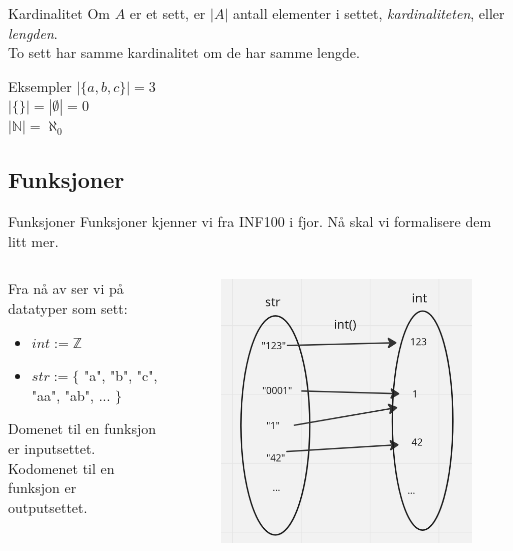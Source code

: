 \begin{frame}{Kardinalitet}
    Om $A$ er et sett, er $|A|$ antall elementer i settet, \textit{kardinaliteten}, eller \textit{lengden}.\\
    To sett har samme kardinalitet om de har samme lengde.
    \begin{block}{Eksempler}
        $|\{a, b, c\}| = 3$ \\
        $|\{\}| = |\emptyset| = 0$\\
        $|\mathbb{N}| = \aleph_0$
    \end{block}
\end{frame}

\subsection{Funksjoner}
\begin{frame}{Funksjoner}
    Funksjoner kjenner vi fra INF100 i fjor. Nå skal vi formalisere dem litt mer.\\
    \begin{columns}
        \begin{column}{0.5\textwidth}
            Fra nå av ser vi på datatyper som sett:
            \begin{itemize}
                \item $int := \mathbb{Z}$
                \item $str := \{$ "a", "b", "c", "aa", "ab", ... $\}$
            \end{itemize}
            Domenet til en funksjon er inputsettet.\\
            Kodomenet til en funksjon er outputsettet.
        \end{column}
        \pause
        \begin{column}{0.5\textwidth}
            \begin{figure}
               \includegraphics[scale = 0.4]{images/int.png} 

\end{figure}
\end{column}
\end{columns}
\end{frame}
